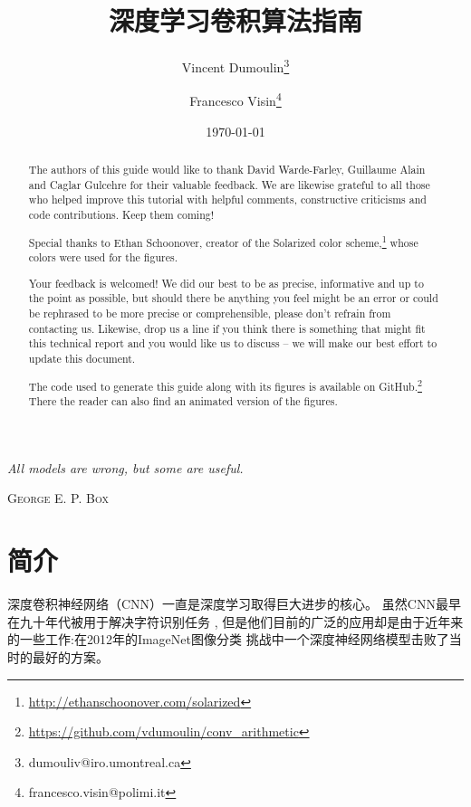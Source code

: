 \documentclass[notitlepage]{report}
\title{深度学习卷积算法指南}
\author[$\bigstar$]{Vincent Dumoulin\thanks{dumouliv@iro.umontreal.ca}}
\author[$\bigstar\dagger$]{Francesco Visin\thanks{francesco.visin@polimi.it}}
\affil[$\bigstar$]{MILA, Universit\'{e} de Montr\'{e}al}
\affil[$\dagger$]{AIRLab, Politecnico di Milano}
\date{\today}
\let\originalepigraph\epigraph
\renewcommand\epigraph[2]{\originalepigraph{\textit{#1}}{\textsc{#2}}}
\begin{document}
\maketitle
\thispagestyle{empty}
\clearpage

\setlength{\epigraphwidth}{0.4\textwidth}
\epigraph{All models are wrong, but some are useful.}{George E. P. Box}
\clearpage

\renewcommand{\abstractname}{Acknowledgements}
\begin{abstract}
    The authors of this guide would like to thank David Warde-Farley, Guillaume
    Alain and Caglar Gulcehre for their valuable feedback. We are likewise
    grateful to all those who helped improve this tutorial with helpful
    comments, constructive criticisms and code contributions. Keep them coming!

    Special thanks to Ethan Schoonover, creator of the Solarized color
    scheme,\footnote{\url{http://ethanschoonover.com/solarized}} whose colors
    were used for the figures.
\end{abstract}

\renewcommand{\abstractname}{Feedback}
\begin{abstract}
    Your feedback is welcomed! We did our best to be as precise, informative and
    up to the point as possible, but should there be anything you feel might be
    an error or could be rephrased to be more precise or comprehensible, please
    don't refrain from contacting us. Likewise, drop us a line if you think
    there is something that might fit this technical report and you would like
    us to discuss -- we will make our best effort to update this document.
\end{abstract}

\renewcommand{\abstractname}{Source code and animations}
\begin{abstract}
    The code used to generate this guide along with its figures is available on
    GitHub.\footnote{\url{https://github.com/vdumoulin/conv_arithmetic}} There
    the reader can also find an animated version of the figures.
\end{abstract}

\tableofcontents

\chapter{简介}

深度卷积神经网络（CNN）一直是深度学习取得巨大进步的核心。 虽然CNN最早在九十年代被用于解决字符识别任务
\citep{le1997reading}, 但是他们目前的广泛的应用却是由于近年来的一些工作:在2012年的ImageNet图像分类
挑战中一个深度神经网络模型击败了当时的最好的方案\citep{krizhevsky2012imagenet}。
\end{document}
